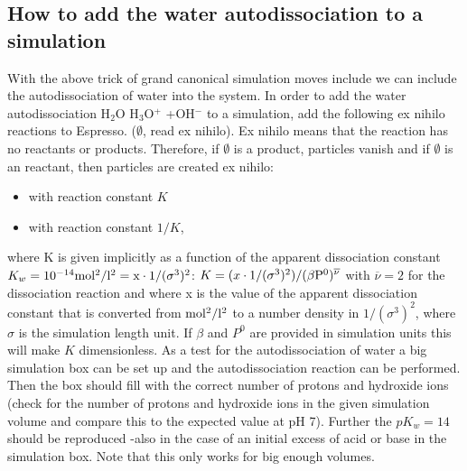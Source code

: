 \subsection{How to add the water autodissociation to a simulation}
With the above trick of grand canonical simulation moves include we can include the autodissociation of water into the system.
In order to add the water autodissociation  H$_2$O \arrow{<=>} H$_3$O$^+$ +OH$^-$ \schemestop  to a simulation, add the following ex nihilo reactions to Espresso. ($\emptyset$, read ex nihilo). Ex nihilo means that the reaction has no reactants or products. Therefore, if $\emptyset$ is a product, particles vanish and if $\emptyset$ is an reactant, then particles are created ex nihilo:
\begin{itemize}
\item {} with reaction constant $K$
\item {} with reaction constant $1/K$,
\end{itemize}
where K is given implicitly as a function of the apparent dissociation constant $K_w=10^{-14} \rm{mol^2/l^2}=x\cdot \rm{1/(\sigma^3)^2}$: $K=(x\cdot \rm{1/(\sigma^3)^2})/(\beta P^0)^{\overline{\nu}}$ with $\overline{\nu}=2$ for the dissociation reaction and where x is the value of the apparent dissociation constant that is converted from $\rm{mol^2/l^2}$ to a number density in $1/(\sigma^3)^2$, where $\sigma$ is the simulation length unit. If $\beta$ and $P^0$ are provided in simulation units this will make $K$ dimensionless. 
As a test for the autodissociation of water a big simulation box can be set up and the autodissociation reaction can be performed. Then the box should fill with the correct number of protons and hydroxide ions (check for the number of protons and hydroxide ions in the given simulation volume and compare this to the expected value at pH 7). Further the $pK_w=14$ should be reproduced -also in the case of an initial excess of acid or base in the simulation box. Note that this only works for big enough volumes.
